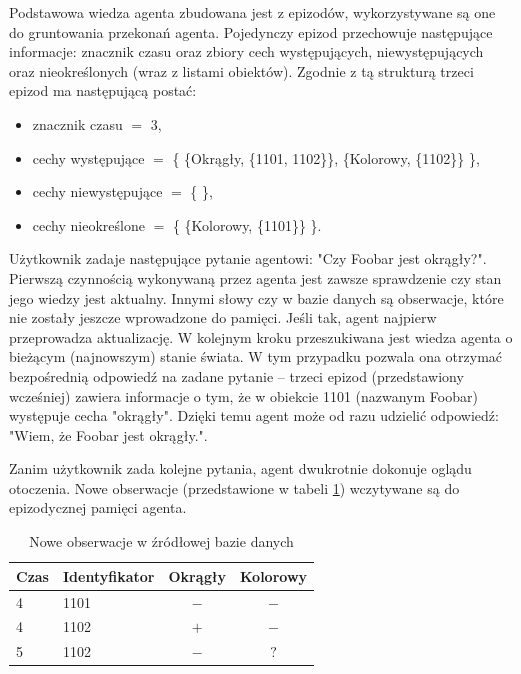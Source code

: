 Podstawowa wiedza agenta zbudowana jest z epizodów, wykorzystywane są one do gruntowania przekonań agenta. Pojedynczy epizod przechowuje następujące informacje: znacznik czasu oraz zbiory cech występujących, niewystępujących oraz nieokreślonych (wraz z listami obiektów). Zgodnie z tą strukturą trzeci epizod ma następującą postać:

\begin{itemize}
	\setlength{\itemindent}{.5in}
	\item znacznik czasu $ = $ 3,
	\item cechy występujące $ = $ \{ \{Okrągły, \{1101, 1102\}\}, \{Kolorowy, \{1102\}\} \},
	\item cechy niewystępujące $ = $ \{ \},
	\item cechy nieokreślone $ = $ \{ \{Kolorowy, \{1101\}\} \}.
\end{itemize}  

Użytkownik zadaje następujące pytanie agentowi: "Czy Foobar jest okrągły?". Pierwszą czynnością wykonywaną przez agenta jest zawsze sprawdzenie czy stan jego wiedzy jest aktualny. Innymi słowy czy w bazie danych są obserwacje, które nie zostały jeszcze wprowadzone do pamięci. Jeśli tak, agent najpierw przeprowadza aktualizację. W kolejnym kroku przeszukiwana jest wiedza agenta o bieżącym (najnowszym) stanie świata. W tym przypadku pozwala ona otrzymać bezpośrednią odpowiedź na zadane pytanie -- trzeci epizod (przedstawiony wcześniej) zawiera informacje o tym, że w obiekcie 1101 (nazwanym Foobar) występuje cecha "okrągły". Dzięki temu agent może od razu udzielić odpowiedź: "Wiem, że Foobar jest okrągły.".

Zanim użytkownik zada kolejne pytania, agent dwukrotnie dokonuje oglądu otoczenia. Nowe obserwacje (przedstawione w tabeli \ref{tab:obserwacje2}) wczytywane są do epizodycznej pamięci agenta. 

\begin{table}[H]
	\caption{Nowe obserwacje w źródłowej bazie danych}
	\label{tab:obserwacje2}
	\centering
	\begin{tabular}{|l|l|c|c|} \hline
		\textbf{Czas} & \textbf{Identyfikator} & \textbf{Okrągły} & \textbf{Kolorowy} \\ \hline
		4  &  1101  &  $ - $  &  $ - $  \\ \hline
		4  &  1102  &  $ + $  &  $ - $  \\ \hline
		5  &  1102  &  $ - $  &  $ ? $  \\ \hline
	\end{tabular}
\end{table}

